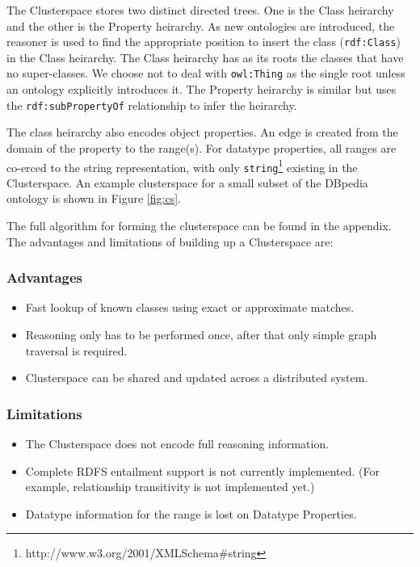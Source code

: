 \documentclass[conference]{IEEEtran}
\begin{document}
The Clusterspace stores two distinct directed trees. One is the Class heirarchy
and the other is the Property heirarchy. As new ontologies are introduced, the
reasoner is used to find the appropriate position to insert the class
(\texttt{rdf:Class}) in the Class heirarchy. The Class heirarchy has as its
roots the classes that have no super-classes. We choose not to deal with
\texttt{owl:Thing} as the single root unless an ontology explicitly introduces
it. The Property heirarchy is similar but uses the \texttt{rdf:subPropertyOf}
relationship to infer the heirarchy.

The class heirarchy also encodes object properties. An edge is created from the
domain of the property to the range(s). For datatype properties, all ranges are
co-erced to the string representation, with only
\texttt{string}\footnote{http://www.w3.org/2001/XMLSchema\#string} existing in
the Clusterspace. An example clusterspace for a small subset of the DBpedia
ontology is shown in Figure \ref{fig:cs}.

The full algorithm for forming the clusterspace can be found in the appendix. %
The advantages and limitations of building up a Clusterspace are:

\subsubsection*{Advantages}
\begin{itemize}
    \item Fast lookup of known classes using exact or approximate matches.
    \item Reasoning only has to be performed once, after that only simple graph
        traversal is required.
    \item Clusterspace can be shared and updated across a distributed system.
\end{itemize}

\subsubsection*{Limitations}
\begin{itemize}
    \item The Clusterspace does not encode full reasoning information.
    \item Complete RDFS entailment support is not currently implemented. (For
        example, relationship transitivity is not implemented yet.)
    \item Datatype information for the range is lost on Datatype Properties.
\end{itemize}
\end{document}
